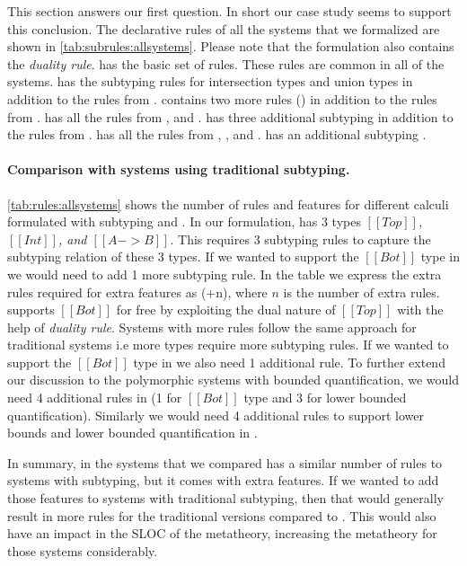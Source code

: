 This section answers our first question. In short our case study seems
to support this conclusion.
The declarative \nameduo rules of all the systems that we formalized are shown in
\cref{tab:subrules:allsystems}. Please note that the formulation also contains
the \emph{duality rule}. \gstlc has the basic set of \nameduo rules.
These rules are common in all of the systems. \gstlciu has the subtyping rules for intersection types and union types in addition to the rules from \gstlc.
\gfp contains two more rules () in addition to the rules from \gstlc.
\gfpiu has all the rules from \gstlc, \gstlciu and \gfp.
\gfsk has three additional subtyping  in addition to the rules from \gstlc.
\gfskiu has all the rules from \gstlc, \gstlciu, and \gfsk. \gf has an additional subtyping .



\paragraph{Comparison with systems using traditional subtyping.}
\cref{tab:rules:allsystems} shows the number of rules and features
for different calculi formulated with subtyping and \nameduo.
In our formulation, \stlc has 3 types \emph{$[[Top]]$, $[[Int]]$,
  and $[[A -> B]]$}. This requires 3 subtyping rules to capture the
subtyping relation of these 3 types. If we wanted to support
the $[[Bot]]$ type in \stlc we would
need to add 1 more subtyping rule. In the table we express the extra rules required
for extra features as (+n), where $n$ is the number of extra rules.
\nameduo supports $[[Bot]]$ for free
by exploiting the dual nature of $[[Top]]$ with the help of
\emph{duality rule}. 
Systems with more rules follow the same approach for
traditional systems i.e more types require more subtyping rules.  If
we wanted to support the $[[Bot]]$
type in \stlciu we also need 1 additional rule.
To further
extend our discussion to the polymorphic systems with bounded
quantification, we would need 4 additional rules in \fsk (1 for
$[[Bot]]$ type and 3 for lower bounded quantification).
Similarly we would need 4 additional rules to support lower bounds and lower bounded
quantification in \fskiu.

In summary, in the systems that we compared \nameduo has a similar number of rules
to systems with subtyping, but it comes with extra features. If we wanted
to add those features to systems with traditional subtyping, then that would
generally result in more rules for the traditional versions compared to \nameduo. This would
also have an impact in the SLOC of the metatheory, increasing the metatheory
for those systems considerably.



